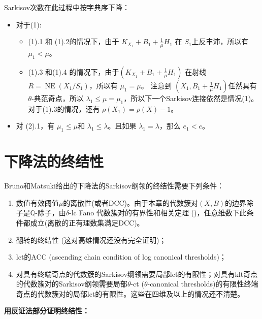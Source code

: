 \begin{remark} \label{R-Sarkisovdeg}
  Sarkisov次数在此过程中按字典序下降：
  \begin{itemize}
    \item 对于(1):
      \begin{itemize}
            \item  (1).1 和 (1).2的情况下，由于 $ K_{X_1}+B_1+\frac{1}{\mu}H_1 $ 在 $S_1$上反丰沛，所以有 $\mu_1<\mu$。
            \item (1).3 和(1).4 的情况下，由于$ (K_{X_1}+B_1+\frac{1}{\mu}H_1) $ 在射线 $ R=\overline{\operatorname{NE}}(X_1/S_1) $，所以有 $\mu_1=\mu$。
              注意到 $ (X_1,B_1+\frac{1}{\mu}H_1) $任然具有$ \theta $-典范奇点，所以 $\lambda_1\leqslant \mu=\mu_1$，所以下一个Sarkisov连接依然是情况(1)。对于(1).3的情况，还有 $\rho(X_1)=\rho(X)-1$。
      \end{itemize}
    \item 对 (2).1，有 $\mu_1\leqslant \mu$和  $\lambda_1\leqslant \lambda$。且如果 $ \lambda_1=\lambda $，那么 $e_1<e$。
  \end{itemize}
\end{remark}

\section{下降法的终结性}\label{termination1}
Bruno和Matsuki给出的下降法的Sarkisov纲领的终结性需要下列条件：
\begin{enumerate}
  \item 数值有效阈值$\mu$的离散性(或者DCC)。由于本章的代数簇对$(X,B)$的边界除子是$\mathbb{Q}$-除子，由$\delta$-lc Fano 代数簇对的有界性和相关定理 (\cite[Theorem 1.1]{birkarSingularitiesLinearSystems2020})，任意维数下此条件都成立(离散的正有理数集满足DCC)。
  \item 翻转的终结性 (这对高维情况还没有完全证明)； 
  \item lct的ACC (ascending chain condition of log canonical thresholds)；
  \item 对具有终端奇点的代数簇的Sarkisov纲领需要局部lct的有限性；对具有klt奇点的代数簇对的Sarkisov纲领需要局部$\theta$-ct ($\theta$-canonical thresholds)的有限性终端奇点的代数簇对的局部lct的有限性。这些在四维及以上的情况还不清楚。
\end{enumerate}
\textbf{用反证法部分证明终结性： }

